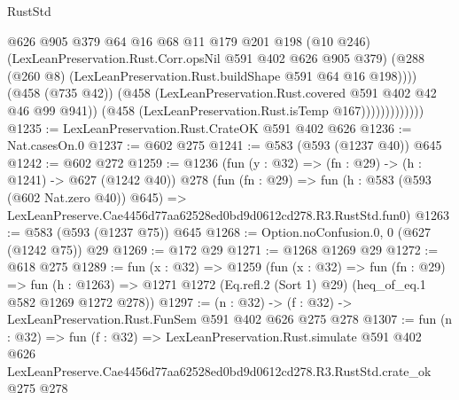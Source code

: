 \begin{lexlean}{RustStd}
\begin{coremodule}
                              @626
                              @905
                              @379
                              @64
                              @16
                              @68
                              @11
                              @179
                              @201
                              @198
                              (@10 @246)
                              (LexLeanPreservation.Rust.Corr.opsNil @591 @402 @626 @905 @379)
                              (@288
                                (@260 @8)
                                (LexLeanPreservation.Rust.buildShape @591 @64 @16 @198))))
                          (@458 (@735 @42))
                          (@458 (LexLeanPreservation.Rust.covered @591 @402 @42 @46 @99 @941))
                          (@458 (LexLeanPreservation.Rust.isTemp @167)))))))))))))
@1235 := LexLeanPreservation.Rust.CrateOK @591 @402 @626
@1236 := Nat.casesOn.{0}
@1237 := @602 @275
@1241 := @583 (@593 (@1237 @40)) @645
@1242 := @602 @272
@1259 := @1236
    (fun (y : @32) => (fn : @29) -> (h : @1241) -> @627 (@1242 @40))
    @278
    (fun (fn : @29) =>
    fun (h : @583 (@593 (@602 Nat.zero @40)) @645) =>
    LexLeanPreserve.Cae4456d77aa62528ed0bd9d0612cd278.R3.RustStd.fun0)
@1263 := @583 (@593 (@1237 @75)) @645
@1268 := Option.noConfusion.{0, 0} (@627 (@1242 @75)) @29
@1269 := @172 @29
@1271 := @1268 @1269 @29
@1272 := @618 @275
@1289 := fun (x : @32) =>
  @1259
    (fun (x : @32) =>
    fun (fn : @29) =>
    fun (h : @1263) => @1271 @1272 (Eq.refl.{2} (Sort 1) @29) (heq_of_eq.{1} @582 @1269 @1272 @278))
@1297 := (n : @32) -> (f : @32) -> LexLeanPreservation.Rust.FunSem @591 @402 @626 @275 @278
@1307 := fun (n : @32) =>
  fun (f : @32) =>
  LexLeanPreservation.Rust.simulate
    @591
    @402
    @626
    LexLeanPreserve.Cae4456d77aa62528ed0bd9d0612cd278.R3.RustStd.crate_ok
    @275
    @278
\end{coremodule}
\end{lexlean}
